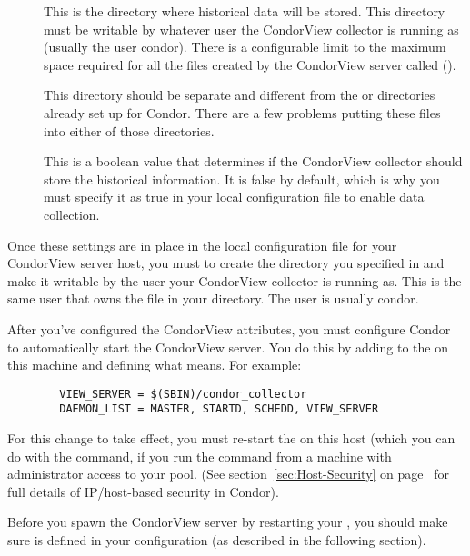 \begin{description}

\item[] This is the directory where
historical data will be stored.
This directory must be writable by whatever user the CondorView
collector is running as (usually the user condor).  
There is a configurable limit to the maximum space required for all
the files created by the CondorView server called
(). 

\Note This directory should be separate and different from the
 or  directories already set up for
Condor.
There are a few problems putting these files into either of those
directories.

\item[] This is a boolean value that determines
if the CondorView collector should store the historical information.
It is false by default, which is why you must specify it as true in
your local configuration file to enable data collection.

\end{description}

Once these settings are in place in the local configuration file for your
CondorView server host, you must to create the directory you specified
in  and make it writable by the user your
CondorView collector is running as.
This is the same user that owns the  file in
your  directory. The user is usually condor.

After you've configured the CondorView attributes, you must configure
Condor to automatically start the CondorView server. 
You do this by adding  to the
 on this machine and defining what
 means.
For example:
\begin{verbatim}
        VIEW_SERVER = $(SBIN)/condor_collector
        DAEMON_LIST = MASTER, STARTD, SCHEDD, VIEW_SERVER
\end{verbatim}
For this change to take effect, you must re-start the
 on this host (which you can do with the
 command, if you run the command from a machine with 
administrator access to your pool.
(See section~\ref{sec:Host-Security} on
page~\pageref{sec:Host-Security} for full details of IP/host-based
security in Condor).

\Note Before you spawn the CondorView server by restarting your
, you should make sure  is
defined in your configuration (as described in the following section).


